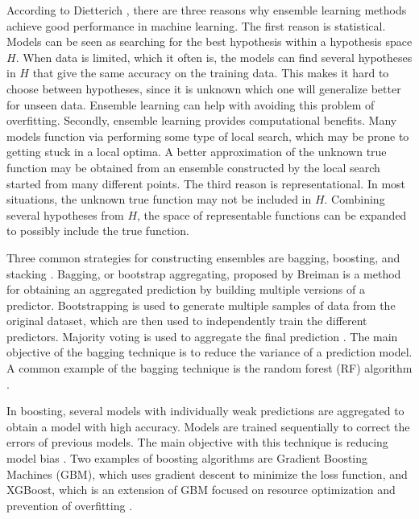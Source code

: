 According to Dietterich \cite{dietterich_ensemble_2000}, there are three reasons why ensemble learning methods achieve good performance in machine learning. The first reason is statistical. Models can be seen as searching for the best hypothesis within a hypothesis space $H$. When data is limited, which it often is, the models can find several hypotheses in $H$ that give the same accuracy on the training data. This makes it hard to choose between hypotheses, since it is unknown which one will generalize better for unseen data. Ensemble learning can help with avoiding this problem of overfitting. Secondly, ensemble learning provides computational benefits. Many models function via performing some type of local search, which may be prone to getting stuck in a local optima. A better approximation of the unknown true function may be obtained from an ensemble constructed by the local search started from many different points. The third reason is representational. In most situations, the unknown true function may not be included in $H$. Combining several hypotheses from $H$, the space of representable functions can be expanded to possibly include the true function.

Three common strategies for constructing ensembles are bagging, boosting, and stacking \cite{moon_advancing_2024}. Bagging, or bootstrap aggregating, proposed by Breiman \cite{breiman_bagging_1996} is a method for obtaining an aggregated prediction by building multiple versions of a predictor. Bootstrapping is used to generate multiple samples of data from the original dataset, which are then used to independently train the different predictors. Majority voting is used to aggregate the final prediction \cite{sagi_ensemble_2018}. The main objective of the bagging technique is to reduce the variance of a prediction model. A common example of the bagging technique is the random forest (RF) algorithm \cite{moon_advancing_2024,ribeiro_ensemble_2020}.

In boosting, several models with individually weak predictions are aggregated to obtain a model with high accuracy. Models are trained sequentially to correct the errors of previous models. The main objective with this technique is reducing model bias \cite{moon_advancing_2024,ribeiro_ensemble_2020,schapire_strength_1990}. Two examples of boosting algorithms are Gradient Boosting Machines (GBM), which uses gradient descent to minimize the loss function, and XGBoost, which is an extension of GBM focused on resource optimization and prevention of overfitting \cite{ribeiro_ensemble_2020}.

